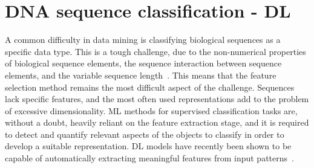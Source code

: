 
\section{DNA sequence classification - DL}

A common difficulty in data mining is classifying biological sequences as a specific data type. This is a tough challenge, due to the non-numerical properties of biological sequence elements, the sequence interaction between sequence elements, and the variable sequence length~\cite{Yang2020ReviewDNA}. This means that the feature selection method remains the most difficult aspect of the challenge. Sequences lack specific features, and the most often used representations add to the problem of excessive dimensionality. \gls{ML} methods for supervised classification tasks are, without a doubt, heavily reliant on the feature extraction stage, and it is required to detect and quantify relevant aspects of the objects to classify in order to develop a suitable representation. \gls{DL} models have recently been shown to be capable of automatically extracting meaningful features from input patterns~\cite{LoBosco2017DeepClassification}.

